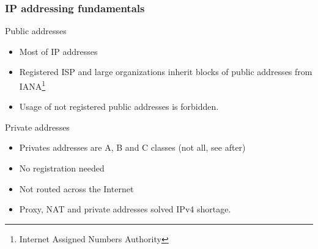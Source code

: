   \begin{frame}
    \frametitle{IP addressing fundamentals}
    \begin{block}{Public addresses}
      \begin{itemize}
        \item Most of IP addresses
        \item Registered ISP and large organizations inherit blocks of public addresses from IANA\footnote{Internet Assigned Numbers Authority}
        \item Usage of not registered public addresses is forbidden.
      \end{itemize}
    \end{block}
    \begin{block}{Private addresses}
      \begin{itemize}
        \item Privates addresses are A, B and C classes (not all, see after)
        \item No registration needed
        \item Not routed across the Internet
        \item Proxy, NAT and private addresses solved IPv4 shortage.
      \end{itemize}
    \end{block}
  \end{frame}

